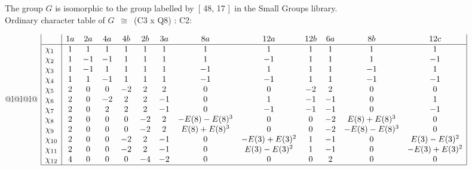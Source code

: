 \documentclass[varwidth=\maxdimen,border=10]{standalone}
\begin{document}
The group $G$ is isomorphic to the group labelled by\ [ 48, 17 ]\ in the Small Groups library.\\
Ordinary character table of $G$\ $\cong$\ (C3 x Q8) : C2:\\
\begin{center}
\begin{tabular}{@{}l@{}l@{}l@{}}
\hline
\(\begin{array}{|l|cccccccccccc|}
  & 1a & 2a & 4a & 4b & 2b & 3a & 8a & 12a & 12b & 6a & 8b & 12c\\ \hline
\chi_{1} & 1 & 1 & 1 & 1 & 1 & 1 & 1 & 1 & 1 & 1 & 1 & 1\\
\chi_{2} & 1 & -1 & -1 & 1 & 1 & 1 & 1 & -1 & 1 & 1 & 1 & -1\\
\chi_{3} & 1 & -1 & 1 & 1 & 1 & 1 & -1 & 1 & 1 & 1 & -1 & 1\\
\chi_{4} & 1 & 1 & -1 & 1 & 1 & 1 & -1 & -1 & 1 & 1 & -1 & -1\\
\chi_{5} & 2 & 0 & 0 & -2 & 2 & 2 & 0 & 0 & -2 & 2 & 0 & 0\\
\chi_{6} & 2 & 0 & -2 & 2 & 2 & -1 & 0 & 1 & -1 & -1 & 0 & 1\\
\chi_{7} & 2 & 0 & 2 & 2 & 2 & -1 & 0 & -1 & -1 & -1 & 0 & -1\\
\chi_{8} & 2 & 0 & 0 & 0 & -2 & 2 & -E(8)-E(8)^{3} & 0 & 0 & -2 & E(8)+E(8)^{3} & 0\\
\chi_{9} & 2 & 0 & 0 & 0 & -2 & 2 & E(8)+E(8)^{3} & 0 & 0 & -2 & -E(8)-E(8)^{3} & 0\\
\chi_{10} & 2 & 0 & 0 & -2 & 2 & -1 & 0 & -E(3)+E(3)^{2} & 1 & -1 & 0 & E(3)-E(3)^{2}\\
\chi_{11} & 2 & 0 & 0 & -2 & 2 & -1 & 0 & E(3)-E(3)^{2} & 1 & -1 & 0 & -E(3)+E(3)^{2}\\
\chi_{12} & 4 & 0 & 0 & 0 & -4 & -2 & 0 & 0 & 0 & 2 & 0 & 0\\
\hline
\end{array}\)\\
\end{tabular}
\end{center}
\end{document}
